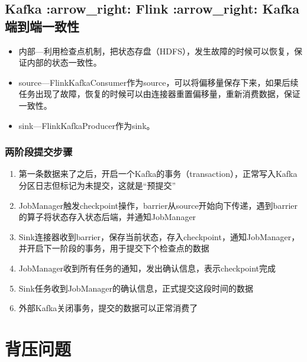 \hypertarget{kafka-arrow_right-flink-arrow_right-kafkaux7aefux5230ux7aefux4e00ux81f4ux6027}{%
\subsection{Kafka :arrow\_right: Flink :arrow\_right:
Kafka端到端一致性}\label{kafka-arrow_right-flink-arrow_right-kafkaux7aefux5230ux7aefux4e00ux81f4ux6027}}

\begin{itemize}
\tightlist
\item
  内部---利用检查点机制，把状态存盘（HDFS），发生故障的时候可以恢复，保证内部的状态一致性。
\item
  source---FlinkKafkaConsumer作为source，可以将偏移量保存下来，如果后续任务出现了故障，恢复的时候可以由连接器重置偏移量，重新消费数据，保证一致性。
\item
  sink---FlinkKafkaProducer作为sink。
\end{itemize}

\hypertarget{ux4e24ux9636ux6bb5ux63d0ux4ea4ux6b65ux9aa4}{%
\subsubsection{两阶段提交步骤}\label{ux4e24ux9636ux6bb5ux63d0ux4ea4ux6b65ux9aa4}}

\begin{enumerate}
\def\labelenumi{\arabic{enumi}.}
\tightlist
\item
  第一条数据来了之后，开启一个Kafka的事务（transaction），正常写入Kafka分区日志但标记为未提交，这就是``预提交''
\item
  JobManager触发checkpoint操作，barrier从source开始向下传递，遇到barrier的算子将状态存入状态后端，并通知JobManager
\item
  Sink连接器收到barrier，保存当前状态，存入checkpoint，通知JobManager，并开启下一阶段的事务，用于提交下个检查点的数据
\item
  JobManager收到所有任务的通知，发出确认信息，表示checkpoint完成
\item
  Sink任务收到JobManager的确认信息，正式提交这段时间的数据
\item
  外部Kafka关闭事务，提交的数据可以正常消费了
\end{enumerate}

\hypertarget{ux80ccux538bux95eeux9898}{%
\section{背压问题}\label{ux80ccux538bux95eeux9898}}

